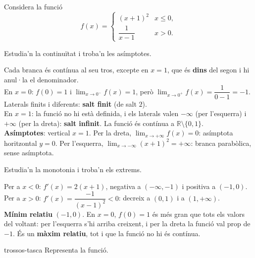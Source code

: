 Considera la funció
\[
f(x)=\begin{cases}
  (x+1)^2 & \si{x\le 0},\\[4pt]
  \dfrac{1}{x-1} & \si{x>0}.
\end{cases}
\]

\begin{apartats}

Estudia'n la continuïtat i troba'n les asímptotes.

\begin{solucio}
Cada branca és contínua al seu tros, excepte en $x=1$, que és \textbf{dins} del segon i hi anul·la el
denominador.\\
En $x=0$: $f(0)=1$ i $\lim_{x\to0^-}f(x)=1$, però $\lim_{x\to0^+}f(x)=\dfrac{1}{0-1}=-1$. Laterals finits
i diferents: \textbf{salt finit} (de salt $2$).\\
En $x=1$: la funció no hi està definida, i els laterals valen $-\infty$ (per l'esquerra) i $+\infty$
(per la dreta): \textbf{salt infinit}. La funció és contínua a $\mathbb{R}\setminus\{0,1\}$.\\
\textbf{Asímptotes}: vertical $x=1$. Per la dreta, $\lim_{x\to+\infty}f(x)=0$: asímptota horitzontal
$y=0$. Per l'esquerra, $\lim_{x\to-\infty}(x+1)^2=+\infty$: branca parabòlica, sense asímptota.
\end{solucio}

\begin{nomesllarg}
Estudia'n la monotonia i troba'n els extrems.

\begin{solucio}
Per a $x<0$: $f'(x)=2(x+1)$, negativa a $(-\infty,-1)$ i positiva a $(-1,0)$.\\
Per a $x>0$: $f'(x)=\dfrac{-1}{(x-1)^2}<0$: decreix a $(0,1)$ i a $(1,+\infty)$.\\
\textbf{Mínim relatiu} $(-1,0)$. En $x=0$, $f(0)=1$ és més gran que tots els valors del voltant: per
l'esquerra s'hi arriba creixent, i per la dreta la funció val prop de $-1$. És un \textbf{màxim
relatiu}, tot i que la funció no hi és contínua.
\end{solucio}
\end{nomesllarg}

\begin{tria}{trossos-tasca}
Representa la funció.


\end{tria}
\end{apartats}
